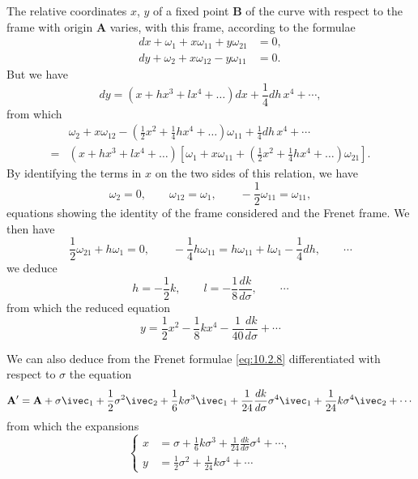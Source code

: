 The relative coordinates $x$, $y$ of a fixed point $\mathbf{B}$ of the curve with respect to the frame with origin $\mathbf{A}$ varies, with this frame, according to the formulae
\begin{align*}
  dx+\omega_{1}+x\omega_{11}+y\omega_{21}&=0,\\
  dy+\omega_{2}+x\omega_{12}-y\omega_{11}&=0.
\end{align*}
But we have
\[
dy=(x+hx^{3}+lx^{4}+\dots)dx+\frac{1}{4}dh\,x^{4}+\cdots,
\]
from which
\begin{align*}
  &{}\omega_{2}+x\omega_{12}-\left(\frac{1}{2}x^{2}+\frac{1}{4}hx^{4}+\dots\right)\omega_{11}+\frac{1}{4}dh\,x^{4}+\cdots\\
  {}={}&{}(x+hx^{3}+lx^{4}+\dots)\left[\omega_{1}+x\omega_{11}+\left(\frac{1}{2}x^{2}+\frac{1}{4}hx^{4}+\dots\right)\omega_{21}\right].
\end{align*}
By identifying the terms in $x$ on the two sides of this relation, we have
\[
\omega_{2}=0,\qquad\omega_{12}=\omega_{1},\qquad-\frac{1}{2}\omega_{11}=\omega_{11},
\]
equations showing the identity of the frame considered and the Frenet frame. We then have
\[
\frac{1}{2}\omega_{21}+h\omega_{1}=0,\qquad-\frac{1}{4}h\omega_{11}=h\omega_{11}+l\omega_{1}-\frac{1}{4}dh,\qquad\cdots
\]
we deduce
\[
h=-\frac{1}{2}k,\qquad l=-\frac{1}{8}\frac{dk}{d\sigma},\qquad \cdots
\]
from which the reduced equation
\begin{equation}
  \label{eq:10.2.17}
  y=\frac{1}{2}x^{2}-\frac{1}{8}kx^{4}-\frac{1}{40}\frac{dk}{d\sigma}+\cdots
\end{equation}

We can also deduce from the Frenet formulae \eqref{eq:10.2.8} differentiated with respect to $\sigma$ the equation
\[
\mathbf{A}'=\mathbf{A}+\sigma\ivec_{1}+\frac{1}{2}\sigma^{2}\ivec_{2}+\frac{1}{6} k\sigma^{3}\ivec_{1}+\frac{1}{24}\frac{dk}{d\sigma}\sigma^{4}\ivec_{1}+\frac{1}{24} k\sigma^{4}\ivec_{2}+\cdots
\]
from which the expansions
\begin{equation}
  \label{eq:10.2.18}
  \left\{
    \begin{aligned}
      x&=\sigma+\frac{1}{6}k\sigma^{3}+\frac{1}{24}\frac{dk}{d\sigma}\sigma^{4}+\cdots,\\
      y&=\frac{1}{2}\sigma^{2}+\frac{1}{24}k\sigma^{4}+\cdots
    \end{aligned}
  \right.
\end{equation}

